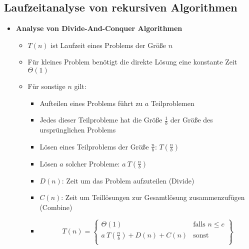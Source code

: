 \subsection{Laufzeitanalyse von rekursiven Algorithmen}
    \begin{itemize}
        \item \textbf{Analyse von Divide-And-Conquer Algorithmen}
            \begin{itemize}
                \item $T(n)$ ist Laufzeit eines Problems der Größe $n$
                \item Für kleines Problem benötigt die direkte Lösung eine konstante Zeit $\Theta(1)$
                \item Für sonstige $n$ gilt:
                    \begin{itemize}
                        \item Aufteilen eines Problems führt zu $a$ Teilproblemen
                        \item Jedes dieser Teilprobleme hat die Größe $\frac{1}{b}$ der Größe des ursprünglichen Problems
                        \item Lösen eines Teilproblems der Größe $\frac{n}{b}$: $T(\frac{n}{b})$
                        \item Lösen $a$ solcher Probleme: $a~T(\frac{n}{b})$
                        \item $D(n)$: Zeit um das Problem aufzuteilen (Divide)
                        \item $C(n)$: Zeit um Teillösungen zur Gesamtlösung zusammenzufügen (Combine)
                        \item[] \[
                                T(n) = \left.
                                    \begin{cases}
                                        \Theta(1) & \text{falls } n \leq c \\
                                        a~T(\frac{n}{b}) + D(n) + C(n) & \text{sonst}  \\
                                    \end{cases}
                                    \right \}
                                \]
                    \end{itemize}
            \end{itemize}


\end{itemize}
